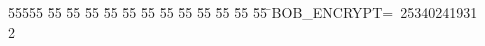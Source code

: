 %
%
\begin{tabbing}
55555 \= 55 \= 55 \= 55 \= 55 \= 55 \= 55 \= 55 \= 55 \= 55 \= 55 \= 55 \= 55 \= \>BOB\_ENCRYPT=\ 25340241931\\[0pt]
2\>\end{tabbing}

